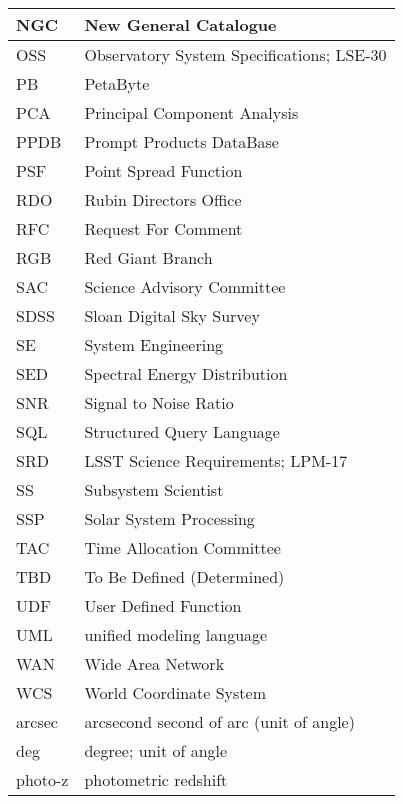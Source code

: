 \begin{longtable}{p{}p{}}
NGC & New General Catalogue \\\hline
OSS & Observatory System Specifications; LSE-30 \\\hline
PB & PetaByte \\\hline
PCA & Principal Component Analysis \\\hline
PPDB & Prompt Products DataBase \\\hline
PSF & Point Spread Function \\\hline
RDO & Rubin Directors Office \\\hline
RFC & Request For Comment \\\hline
RGB & Red Giant Branch \\\hline
SAC & Science Advisory Committee \\\hline
SDSS & Sloan Digital Sky Survey \\\hline
SE & System Engineering \\\hline
SED & Spectral Energy Distribution \\\hline
SNR & Signal to Noise Ratio \\\hline
SQL & Structured Query Language \\\hline
SRD & LSST Science Requirements; LPM-17 \\\hline
SS & Subsystem Scientist \\\hline
SSP & Solar System Processing \\\hline
TAC & Time Allocation Committee \\\hline
TBD & To Be Defined (Determined) \\\hline
UDF & User Defined Function \\\hline
UML & unified modeling language \\\hline
WAN & Wide Area Network \\\hline
WCS & World Coordinate System \\\hline
arcsec & arcsecond second of arc (unit of angle) \\\hline
deg & degree; unit of angle \\\hline
photo-z & photometric redshift \\\hline
\end{longtable}
